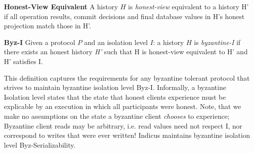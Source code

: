 \par\textbf{Honest-View Equivalent} A history $H$ is \textit{honest-view} equivalent to a history H' if all operation results, commit decisions and final database values in H's honest projection match those in H'.


\par \textbf{Byz-I} Given a protocol $P$ and an isolation level $I$:
a history $H$ is \textit{byzantine-I} if there exists an honest history \textit{H'} such that H is honest-view equivalent to H' and H' satisfies I.

This definition captures the requirements for any byzantine tolerant protocol that strives to maintain byzantine isolation level Byz-I. Informally, a byzantine Isolation level states that the state that honest clients experience must be explicable by an execution in which all participants were honest. Note, that we make no assumptions on the state a byzantine client \textit{chooses} to experience; Byzantine client reads may be arbitrary, i.e. read values need not respect I, nor correspond to writes that were ever written! Indicus maintains byzantine isolation level Byz-Serializability.


%


